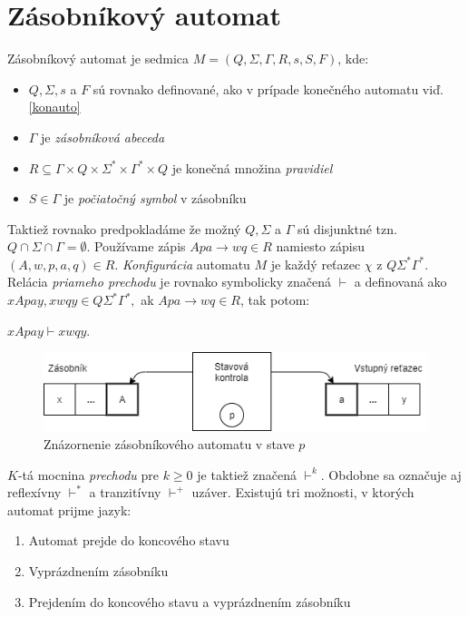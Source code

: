 \section{Zásobníkový automat}
Zásobníkový automat je sedmica $M = (Q, \Sigma, \Gamma, R, s, S, F)$, kde:
\label{zasauto}
\begin{itemize}
\item $Q, \Sigma, s$ a $F$ sú rovnako definované, ako v prípade konečného automatu viď. \ref{konauto} 
\item $\Gamma$ je \textit{zásobníková abeceda}
\item $R \subseteq \Gamma \times Q \times \Sigma^\ast \times \Gamma^\ast \times Q$ je konečná množina \textit{pravidiel}
\item $S \in \Gamma$ je \textit{počiatočný symbol} v zásobníku
\end{itemize} 
Taktiež rovnako predpokladáme že možný $Q, \Sigma$ a $\Gamma$ sú disjunktné tzn. $Q \cap \Sigma \cap \Gamma= \emptyset$. Používame zápis $Apa \to wq \in R$ namiesto zápisu $(A, w, p, a, q) \in R$. \textit{Konfigurácia} automatu $M$ je každý reťazec $\chi$ z $Q\Sigma^\ast\Gamma^\ast$. Relácia \textit{priameho prechodu} je rovnako symbolicky značená $\vdash$ a definovaná ako $xApay, xwqy \in Q\Sigma^\ast\Gamma^\ast, $ ak $ Apa \to wq \in R$, tak potom:
\begin{center}
$xApay \vdash xwqy$.
\end{center}
\begin{figure}[!ht]
\centering
\includegraphics[scale =0.7]{obrazky-figures/automat2.png}
\caption{Znázornenie zásobníkového automatu v stave $p$}
\end{figure}

$K$-tá mocnina \textit{prechodu} pre $k \geq 0$ je taktiež značená $\vdash^k$. Obdobne sa označuje aj reflexívny $\vdash^\ast$ a tranzitívny $\vdash^+$ uzáver. Existujú tri možnosti, v ktorých automat prijme jazyk:
\begin{enumerate}
\item Automat prejde do koncového stavu
\item Vyprázdnením zásobníku
\item Prejdením do koncového stavu a vyprázdnením zásobníku
\end{enumerate}

